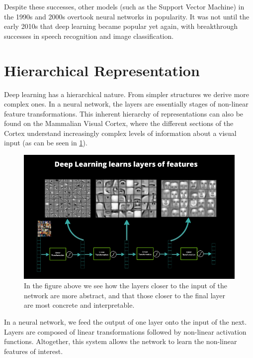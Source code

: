 Despite these successes, other models (such as the Support Vector Machine) in the 1990s and 2000s overtook neural networks in popularity.
It was not until the early 2010s that deep learning became popular yet again, with breakthrough successes in speech recognition and image classification.

\section{Hierarchical Representation}\label{ssec:hierarchical-representation}

Deep learning has a hierarchical nature.
From simpler structures we derive more complex ones.
In a neural network, the layers are essentially stages of non-linear feature transformations.
This inherent hierarchy of representations can also be found on the Mammalian Visual Cortex, where the different sections of the Cortex understand increasingly complex levels of information about a visual input (as can be seen in \cref{fig:deep-learning-hierarchical-features}).

\begin{figure}[ht]
\centering
\includegraphics[width=0.85\linewidth]{figs/deep-learning-hierarchical-features.png}
\caption{In the figure above we see how the layers closer to the input of the network are more abstract, and that those closer to the final layer are most concrete and interpretable.}
\label{fig:deep-learning-hierarchical-features}
\end{figure}

In a neural network, we feed the output of one layer onto the input of the next.
Layers are composed of linear transformations followed by non-linear activation functions.
Altogether, this system allows the network to learn the non-linear features of interest.

